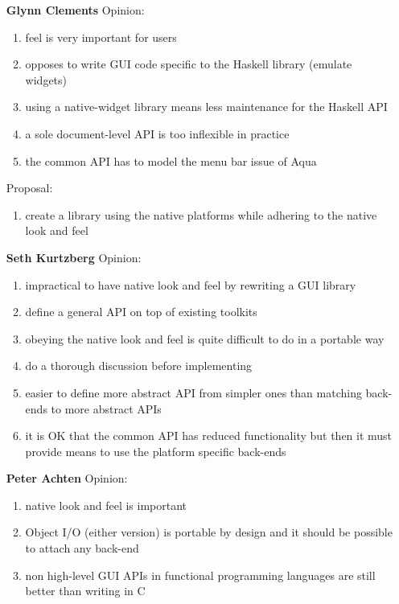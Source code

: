\documentclass{article}
\newcommand{\Party}[1]{\stepcounter{enumi}\arabic{enumi} \bf #1}
\begin{document}
\begin{enumerate}
\item[\Party{Glynn Clements}] Opinion:
  \begin{enumerate}
  \item \label{lookgc} feel is very important for users
  \item opposes to write GUI code specific to the Haskell library
    (emulate widgets)
  \item using a native-widget library means less maintenance for the
    Haskell API
  \item a sole document-level API is too inflexible in practice
  \item the common API has to model the menu bar issue of Aqua
  \end{enumerate}
  Proposal:
  \begin{enumerate}
  \item create a library using the native platforms while adhering to
    the native look and feel
  \end{enumerate}

  
\item[\Party{Seth Kurtzberg}] Opinion:
  \begin{enumerate}
  \item impractical to have native look and feel by
    rewriting a GUI library
  \item define a general API on top of existing toolkits
  \item obeying the native look and feel is quite difficult to do in a
    portable way
  \item do a thorough discussion before implementing
  \item \label{scratchsk} easier to define more abstract API from
    simpler ones than matching back-ends to more abstract APIs %
  \item \label{hindersk} it is OK that the common API has reduced
    functionality but then it must provide means to use the platform
    specific back-ends
  \end{enumerate}
  
\item[\Party{Peter Achten}] Opinion:
  \begin{enumerate}
  \item \label{lookpa} native look and feel is important
  \item \label{portpa} Object I/O (either version) is portable by
    design and it should be possible to attach any back-end
  \item \label{highpa} non high-level GUI APIs in functional programming
    languages are still better than writing in C
  \end{enumerate}


\end{enumerate}
\end{document}
